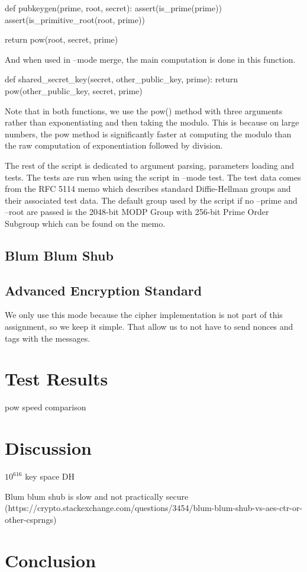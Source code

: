 \documentclass{article}
\begin{document}
\begin{python}
def pubkeygen(prime, root, secret):
    assert(is_prime(prime))
    assert(is_primitive_root(root, prime))

    return pow(root, secret, prime)
\end{python}

And when used in --mode merge, the main computation is done in this function.

\begin{python}
def shared_secret_key(secret, other_public_key, prime):
    return pow(other_public_key, secret, prime)
\end{python}

Note that in both functions, we use the pow() method with three arguments rather than exponentiating and then taking the modulo. This is because on large numbers, the pow method is significantly faster at computing the modulo than the raw computation of exponentiation followed by division.

The rest of the script is dedicated to argument parsing, parameters loading and tests. The tests are run when using the script in --mode test. The test data comes from the RFC 5114\cite{rfc5114} memo which describes standard Diffie-Hellman groups and their associated test data. The default group used by the script if no --prime and --root are passed is the 2048-bit MODP Group with 256-bit Prime Order Subgroup which can be found on the memo.



\subsection{Blum Blum Shub}

\subsection{Advanced Encryption Standard}
We only use this mode because the cipher implementation is not part of this assignment, so we keep it simple. That allow us to not have to send nonces and tags with the messages.


\section{Test Results}

pow speed comparison


\section{Discussion}

$10^{616}$ key space DH

Blum blum shub is slow and not practically secure (https://crypto.stackexchange.com/questions/3454/blum-blum-shub-vs-aes-ctr-or-other-csprngs)

\section{Conclusion}





\end{document}
